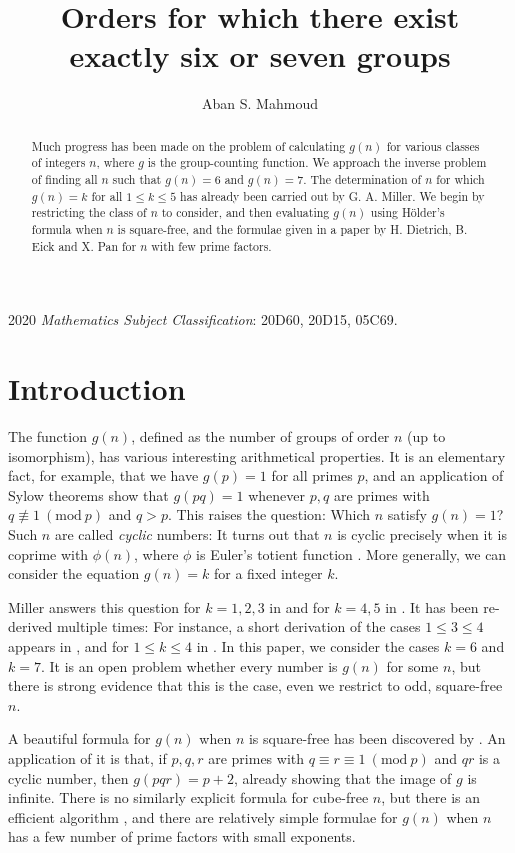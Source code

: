 \documentclass[a4paper, 12pt]{article}
\newcommand{\Mod}[1]{\ (\mathrm{mod} \ #1)}
\theoremstyle{plain}
\theoremstyle{definition}
\begin{document}
\title{Orders for which there exist exactly six or seven groups}
\author{Aban S. Mahmoud}
\maketitle

\begin{abstract}
	Much progress has been made on the problem of calculating $g(n)$ for various classes of integers $n$,  where $g$ is the group-counting function. We approach the inverse problem of finding all $n$ such that $g(n) = 6$ and $g(n) = 7$. The determination of $n$ for which $g(n) = k$ for all $1 \le k \le 5$ has already been carried out by G. A. Miller. We begin by restricting the class of $n$ to consider, and then evaluating $g(n)$ using Hölder's formula when $n$ is square-free, and the formulae given in a paper by H. Dietrich, B. Eick and X. Pan for $n$ with few prime factors.
\end{abstract}

\textup{2020} \textit{Mathematics Subject Classification}: \textup{20D60, 20D15, 05C69}.

\section{Introduction}
The function $g(n)$, defined as the number of groups of order $n$ (up to isomorphism), has various interesting arithmetical properties. It is an elementary fact, for example, that we have $g(p) = 1$ for all primes $p$, and an application of Sylow theorems show that $g(pq) = 1$ whenever $p, q$ are primes with $q \not\equiv 1 \Mod{p}$ and $q > p$. This raises the question: Which $n$ satisfy $g(n) = 1$? Such $n$ are called \emph{cyclic} numbers: It turns out that $n$ is cyclic precisely when it is coprime with $\phi(n)$, where $\phi$ is Euler's totient function {\cite{szele}}. More generally, we can consider the equation $g(n) = k$ for a fixed integer $k$.

Miller answers this question for $k = 1, 2, 3$ in {\cite{miller1}} and for $k = 4, 5$ in {\cite{miller2}}. It has been re-derived multiple times: For instance, a short derivation of the cases $1 \le 3 \le 4$ appears in {\cite{olsson}}, and for $1 \le k \le 4$ in {\cite{gnumoas}}. In this paper, we consider the cases $k = 6$ and $k = 7$. It is an open problem whether every number is $g(n)$ for some $n$, but there is strong evidence that this is the case, even we restrict to odd, square-free $n$.

A beautiful formula for $g(n)$ when $n$ is square-free has been discovered by  {\cite[Thm.~5.1]{gnumoas}}. An application of it is that, if $p, q, r$ are primes with $q \equiv r \equiv 1 \Mod{p}$ and $qr$ is a cyclic number, then $g(pqr) = p + 2$, already showing that the image of $g$ is infinite. There is no similarly explicit formula for cube-free $n$, but there is an efficient algorithm {\cite{cube-free}}, and there are relatively simple formulae for $g(n)$ when $n$ has a few number of prime factors with small exponents.
\end{document}
